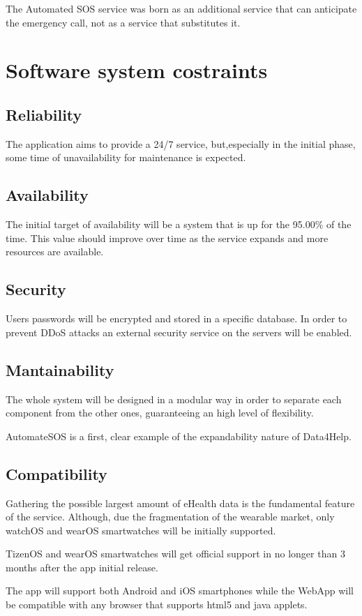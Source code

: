 The Automated SOS service was born as an additional service that can anticipate the emergency call, not as a service that substitutes it.


\section{Software system costraints}
\subsection{Reliability}
The application aims to provide a 24/7 service, but,especially in the initial phase, some time of unavailability for maintenance is expected.
\subsection{Availability}
The initial target of availability will be a system that is up for the 95.00\% of the time. This value should improve over time as the service expands and more resources are available.
\subsection{Security}
Users passwords will be encrypted and stored in a specific database.
In order to prevent DDoS attacks an external security service on the servers will be enabled.
\subsection{Mantainability}
The whole system will be designed in a modular way in order to separate each component from the other ones, guaranteeing an high level of flexibility. 

AutomateSOS is a first, clear example of the expandability nature of Data4Help.
\subsection{Compatibility}
Gathering the possible largest amount of eHealth data is the fundamental feature of the service. Although, due the fragmentation of the wearable market, only watchOS and wearOS smartwatches will be initially supported. 

TizenOS and wearOS smartwatches will get official support in no longer than 3 months after the app initial release.

The app will support both Android and iOS smartphones while the WebApp will be compatible with any browser that supports html5 and java applets.